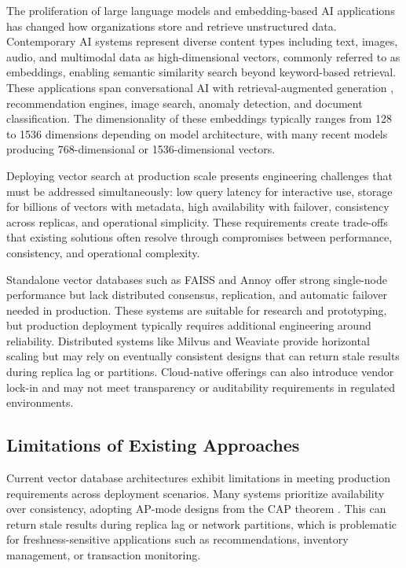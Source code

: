 \documentclass[conference]{IEEEtran}
\begin{document}
The proliferation of large language models and embedding-based AI applications has changed how organizations store and retrieve unstructured data. Contemporary AI systems represent diverse content types including text, images, audio, and multimodal data as high-dimensional vectors, commonly referred to as embeddings, enabling semantic similarity search beyond keyword-based retrieval. These applications span conversational AI with retrieval-augmented generation \cite{rag}, recommendation engines, image search, anomaly detection, and document classification. The dimensionality of these embeddings typically ranges from 128 to 1536 dimensions depending on model architecture, with many recent models producing 768-dimensional or 1536-dimensional vectors.

Deploying vector search at production scale presents engineering challenges that must be addressed simultaneously: low query latency for interactive use, storage for billions of vectors with metadata, high availability with failover, consistency across replicas, and operational simplicity. These requirements create trade-offs that existing solutions often resolve through compromises between performance, consistency, and operational complexity.

Standalone vector databases such as FAISS \cite{faiss} and Annoy \cite{annoy} offer strong single-node performance but lack distributed consensus, replication, and automatic failover needed in production. These systems are suitable for research and prototyping, but production deployment typically requires additional engineering around reliability. Distributed systems like Milvus \cite{milvus} and Weaviate \cite{weaviate} provide horizontal scaling but may rely on eventually consistent designs that can return stale results during replica lag or partitions. Cloud-native offerings can also introduce vendor lock-in and may not meet transparency or auditability requirements in regulated environments.

\subsection{Limitations of Existing Approaches}

Current vector database architectures exhibit limitations in meeting production requirements across deployment scenarios. Many systems prioritize availability over consistency, adopting AP-mode designs from the CAP theorem \cite{cap}. This can return stale results during replica lag or network partitions, which is problematic for freshness-sensitive applications such as recommendations, inventory management, or transaction monitoring.
\end{document}
